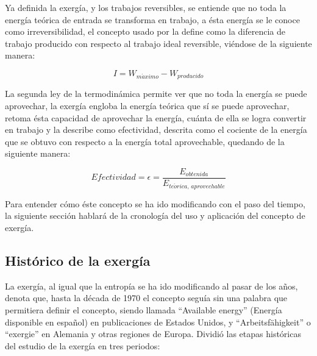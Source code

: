 Ya definida la exergía, y los trabajos reversibles, se entiende que no toda la energía teórica de entrada se transforma en trabajo, a ésta energía se le conoce como irreversibilidad, el concepto usado por \textcite{rajput2009engineering} la define como la diferencia de trabajo producido con respecto al trabajo ideal reversible, viéndose de la siguiente manera:

\begin{equation}
  I = W_{m\acute{a}ximo}-W_{producido}
  \label{eq:eqirr}
\end{equation}

La segunda ley de la termodinámica permite ver que no toda la energía se puede aprovechar, la exergía engloba la energía teórica que sí se puede aprovechar, \textcite{rajput2009engineering} retoma ésta capacidad de aprovechar la energía, cuánta de ella se logra convertir en trabajo y la describe como efectividad, descrita como el cociente de la energía que se obtuvo con respecto a la energía total aprovechable, quedando de la siguiente manera:

\begin{equation}
  Efectividad= \epsilon = \frac{E_{obtenida}}{E_{te\acute{o}rica,\,aprovechable}}
  \label{eq:efectividad}
\end{equation}

Para entender cómo éste concepto se ha ido modificando con el paso del tiempo, la siguiente sección hablará de la cronología del uso y aplicación del concepto de exergía.

\subsection{Histórico de la exergía} %
\label{sub:historiaexergía}

La exergía, al igual que la entropía se ha ido modificando al pasar de los años, \textcite{wallexergy}denota que, hasta la década de 1970 el concepto seguía sin una palabra que permitiera definir el concepto, siendo llamada ``Available energy'' (Energía disponible en español) en publicaciones de Estados Unidos, y ``Arbeitsfähigkeit'' o ``exergie'' en Alemania y otras regiones de Europa. Dividió las etapas históricas del estudio de la exergía en tres periodos:

